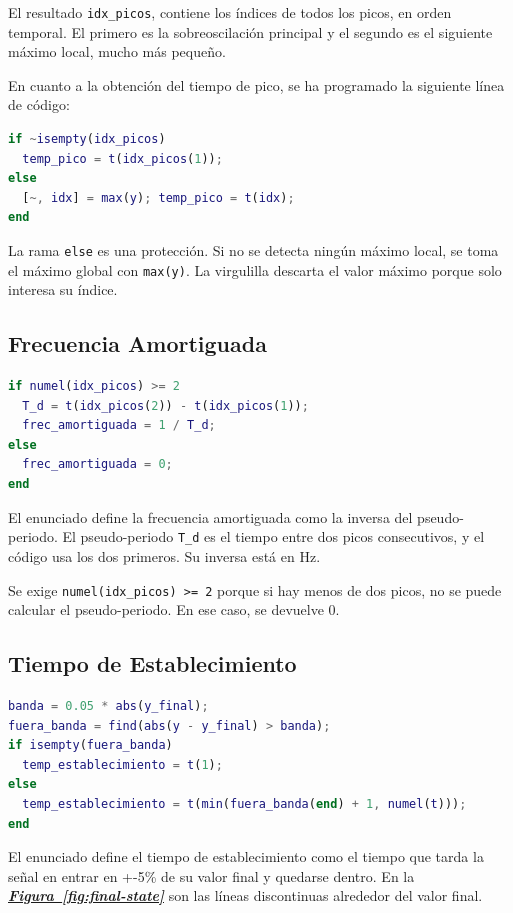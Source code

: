 \documentclass[12pt,a4paper]{article}
\newcommand{\figref}[1]{\hyperref[#1]{\textbf{\textit{\uline{Figura~\ref*{#1}}}}}}
\newcommand{\codigo}[1]{\colorbox{bgcmd}{\texttt{#1}}}
\begin{document}
El resultado \codigo{idx\_picos}, contiene los índices de todos los picos, en orden temporal. El primero es la sobreoscilación principal y el segundo es el siguiente máximo local, mucho más pequeño.

En cuanto a la obtención del tiempo de pico, se ha programado la siguiente línea de código:

\begin{lstlisting}[language=Matlab]
if ~isempty(idx_picos)
  temp_pico = t(idx_picos(1));
else
  [~, idx] = max(y); temp_pico = t(idx);
end
\end{lstlisting}

La rama \codigo{else} es una protección. Si no se detecta ningún máximo local, se toma el máximo global con \codigo{max(y)}. La virgulilla descarta el valor máximo porque solo interesa su índice.

\subsection{Frecuencia Amortiguada}

\begin{lstlisting}[language=Matlab]
if numel(idx_picos) >= 2
  T_d = t(idx_picos(2)) - t(idx_picos(1));
  frec_amortiguada = 1 / T_d;
else
  frec_amortiguada = 0;
end
\end{lstlisting}

El enunciado define la frecuencia amortiguada como la inversa del pseudo-periodo. El pseudo-periodo \codigo{T\_d} es el tiempo entre dos picos consecutivos, y el código usa los dos primeros.
Su inversa está en Hz.

Se exige \codigo{numel(idx\_picos) >= 2} porque si hay menos de dos picos, no se puede calcular el pseudo-periodo. En ese caso, se devuelve 0.

\subsection{Tiempo de Establecimiento}

\begin{lstlisting}[language=Matlab]
banda = 0.05 * abs(y_final);
fuera_banda = find(abs(y - y_final) > banda);
if isempty(fuera_banda)
  temp_establecimiento = t(1);
else
  temp_establecimiento = t(min(fuera_banda(end) + 1, numel(t)));
end 
\end{lstlisting}

El enunciado define el tiempo de establecimiento como el tiempo que tarda la señal en entrar en +-5\% de su valor final y quedarse dentro. En la \figref{fig:final-state} son las líneas discontinuas alrededor del valor final.
\end{document}
